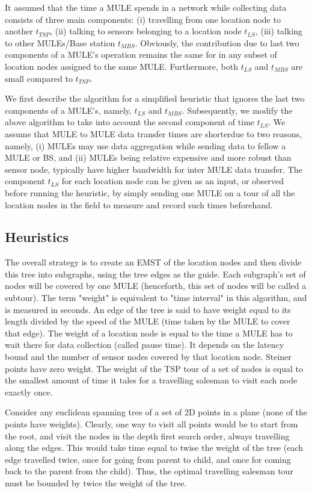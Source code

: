 It assumed that the time a MULE spends in a network while collecting data
consists of three main components: (i) travelling from one location node to another $t_{TSP}$, (ii) talking to sensors belonging to a location node $t_{LS}$, (iii) talking to other MULEs/Base station $t_{MBS}$. Obviously, the 
contribution due to last two components of a MULE's operation remains
the same for in any subset of location nodes assigned to the same MULE. 
Furthermore, both $t_{LS}$ and $t_{MBS}$ are small compared to $t_{TSP}$. 

We first describe the algorithm for a simplified heuristic that ignores the last two components of a MULE's, namely, $t_{LS}$ and $t_{MBS}$. Subsequently, we modify the above algorithm to take into account the second component of time $t_{LS}$. We assume that MULE to MULE data transfer times are shorterdue to two reasons, namely, (i) MULEs may use data aggregation while sending data to fellow a MULE or BS, and (ii) MULEs being relative expensive and more robust than sensor node, typically have higher bandwidth for inter MULE data transfer. The component $t_{LS}$ for each location node can be given as an input, or observed before running the heuristic, by simply sending one MULE on a tour of all the location nodes in the field to measure and record such times beforehand.


\subsection{Heuristics}

The overall strategy is to create an EMST of the location nodes and then divide this tree into subgraphs, using the tree edges as the guide. Each subgraph's set of nodes will be covered by one MULE (henceforth, this set of nodes will be called a subtour). The term "weight" is equivalent to "time interval" in this algorithm, and is measured in seconds. An edge of the tree is said to have weight equal to its length divided by the speed of the MULE (time taken by the MULE to cover that edge). The weight of a location node is equal to the time a MULE has to wait there for data collection (called pause time). It depends on the latency bound and the number of sensor nodes covered by that location node. Steiner points have zero weight. The weight of the TSP tour of a set of nodes is equal to the smallest amount of time it tales for a travelling salesman to visit each node exactly once.

Consider any euclidean spanning tree of a set of 2D points in a plane (none of the points have weights). Clearly, one way to visit all points would be to start from the root, and visit the nodes in the depth first search order, always travelling along the edges. This would take time equal to twise the weight of the tree (each edge travelled twice, once for going from parent to child, and once for coming back to the parent from the child). Thus, the optimal travelling salesman tour must be bounded by twice the weight of the tree. 

